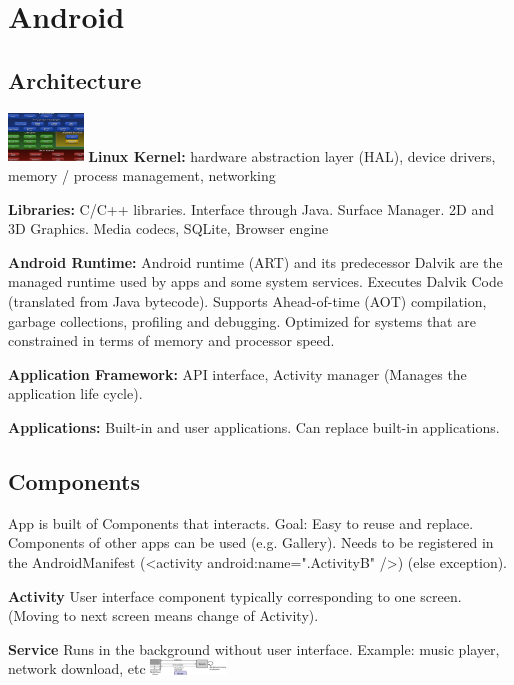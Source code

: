 \section{Android}

\subsection{Architecture}
\includegraphics[width=0.15\textwidth]{android/architecture.png}
\textbf{Linux Kernel:} hardware abstraction layer (HAL), device drivers, memory
/ process management, networking

\textbf{Libraries:} C/C++ libraries. Interface through Java. Surface Manager.
2D and 3D Graphics. Media codecs, SQLite, Browser engine

\textbf{Android Runtime:}
Android runtime (ART) and its predecessor Dalvik are the managed runtime used
by apps and some system services.
Executes Dalvik Code (translated from Java bytecode).
Supports Ahead-of-time (AOT) compilation, garbage collections, profiling and
debugging.
Optimized for systems that are constrained in terms of memory and processor
speed.

\textbf{Application Framework:}
API interface, Activity manager (Manages the application life cycle).

\textbf{Applications:}
Built-in and user applications. Can replace built-in applications.

\subsection{Components}
App is built of Components that interacts. Goal: Easy to reuse and replace.
Components of other apps can be used (e.g. Gallery). Needs to be registered in
the AndroidManifest (<activity android:name=".ActivityB" />) (else exception).

\textbf{Activity}
User interface component typically corresponding to one screen. (Moving to next
screen means change of Activity).

\textbf{Service}
Runs in the background without user interface.
Example: music player, network download, etc
\includegraphics[width=0.15\textwidth]{android/service_example.png}

